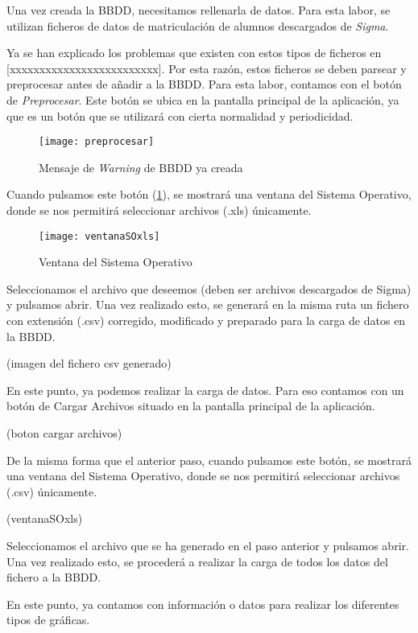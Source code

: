 Una vez creada la BBDD, necesitamos rellenarla de datos. Para esta labor, se utilizan ficheros de datos de matriculación de alumnos descargados de \emph{Sigma}.

Ya se han explicado los problemas que existen con estos tipos de ficheros en [xxxxxxxxxxxxxxxxxxxxxxxxx].
Por esta razón, estos ficheros se deben parsear y preprocesar antes de añadir a la BBDD. Para esta labor, contamos con el botón de \emph{Preprocesar}. Este botón se ubica en la pantalla principal de la aplicación, ya que es un botón que se utilizará con cierta normalidad y periodicidad. 

\begin{figure}%
		\centering
		\texttt{[image: preprocesar]}
		\caption{Mensaje de \emph{Warning} de BBDD ya creada}\label{fig:preprocesar}
	\end{figure}



Cuando pulsamos este botón (\ref{fig:preprocesar}), se mostrará una ventana del Sistema Operativo, donde se nos permitirá seleccionar archivos (.xls) únicamente.


\begin{figure}%
		\centering
		\texttt{[image: ventanaSOxls]}
		\caption{Ventana del Sistema Operativo}\label{fig:ventanaSOxls}
	\end{figure}


Seleccionamos el archivo que deseemos (deben ser archivos descargados de {Sigma}) y pulsamos abrir.
Una vez realizado esto, se generará en la misma ruta un fichero con extensión (.csv) corregido, modificado y preparado para la carga de datos en la BBDD.

(imagen del fichero csv generado)

En este punto, ya podemos realizar la carga de datos. Para eso contamos con un botón de {Cargar Archivos} situado en la pantalla principal de la aplicación.

(boton cargar archivos)

De la misma forma que el anterior paso, cuando pulsamos este botón, se mostrará una ventana del Sistema Operativo, donde se nos permitirá seleccionar 
archivos (.csv) únicamente.

(ventanaSOxls)

Seleccionamos el archivo que se ha generado en el paso anterior y pulsamos abrir.
Una vez realizado esto, se procederá a realizar la carga de todos los datos del fichero a la BBDD.

En este punto, ya contamos con información o datos para realizar los diferentes tipos de gráficas.

